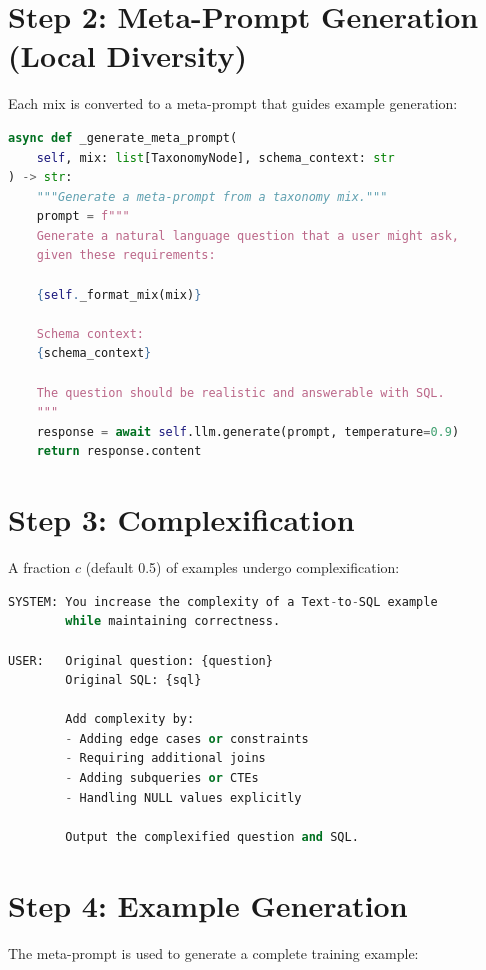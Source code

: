 \section{Step 2: Meta-Prompt Generation (Local Diversity)}

Each mix is converted to a meta-prompt that guides example generation:

\begin{lstlisting}[language=Python,caption={Meta-prompt generation}]
async def _generate_meta_prompt(
    self, mix: list[TaxonomyNode], schema_context: str
) -> str:
    """Generate a meta-prompt from a taxonomy mix."""
    prompt = f"""
    Generate a natural language question that a user might ask,
    given these requirements:
    
    {self._format_mix(mix)}
    
    Schema context:
    {schema_context}
    
    The question should be realistic and answerable with SQL.
    """
    response = await self.llm.generate(prompt, temperature=0.9)
    return response.content
\end{lstlisting}

\section{Step 3: Complexification}

A fraction $c$ (default 0.5) of examples undergo complexification:

\begin{lstlisting}[language=Python,caption={Complexification prompt}]
SYSTEM: You increase the complexity of a Text-to-SQL example
        while maintaining correctness.
        
USER:   Original question: {question}
        Original SQL: {sql}
        
        Add complexity by:
        - Adding edge cases or constraints
        - Requiring additional joins
        - Adding subqueries or CTEs
        - Handling NULL values explicitly
        
        Output the complexified question and SQL.
\end{lstlisting}

\section{Step 4: Example Generation}

The meta-prompt is used to generate a complete training example:

